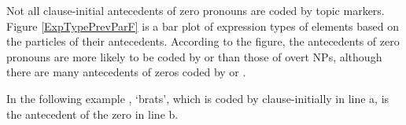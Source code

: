 Not all clause-initial antecedents of zero pronouns are coded by topic markers.
Figure \ref{ExpTypePrevParF} is a bar plot of expression types of elements based on the particles of their antecedents.
According to the figure, the antecedents of zero pronouns are more likely to be coded by  or  than
those of overt NPs,
although there are many antecedents of zeros coded by  or .

In the following example \Next,
 `brats', which is coded by  clause-initially in line a, is the antecedent of the zero in line b.
